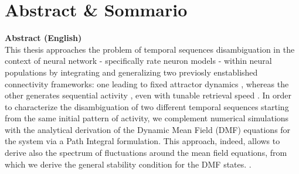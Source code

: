 \documentclass[11pt]{report}
\begin{document}





\chapter*{Abstract \& Sommario}

\noindent\textbf{Abstract (English)} \\[0.5em]
This thesis approaches the problem of temporal sequences disambiguation in the context of neural network -  specifically rate neuron models - within neural populations by integrating and generalizing two previosly enstablished connectivity frameworks: one leading to fixed attractor dynamics \cite{pereira2018}, whereas the other generates sequential activity \cite{gillett2020}, even with tunable retrieval speed \cite{gillett2024}. In order to characterize the disambiguation of two different temporal sequences starting from the same initial pattern of activity, we complement numerical simulations with the analytical derivation of the Dynamic Mean Field (DMF) equations for the system via a Path Integral formulation. This approach, indeed, allows to derive also the spectrum of fluctuations around the mean field equations, from which we derive the general stability condition for the DMF states. \cite{cris&somp2018, metz2025}.
\end{document}
